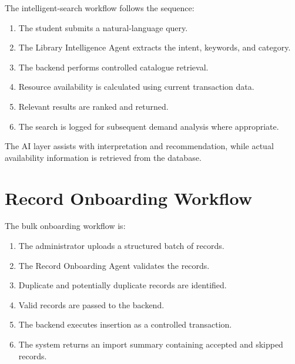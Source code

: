 \documentclass{tietreport}
\begin{document}
The intelligent-search workflow follows the sequence:

\begin{enumerate}

    \item The student submits a natural-language query.

    \item The Library Intelligence Agent extracts the intent, keywords,
    and category.

    \item The backend performs controlled catalogue retrieval.

    \item Resource availability is calculated using current transaction
    data.

    \item Relevant results are ranked and returned.

    \item The search is logged for subsequent demand analysis where
    appropriate.

\end{enumerate}

The AI layer assists with interpretation and recommendation, while actual
availability information is retrieved from the database.

\section{Record Onboarding Workflow}

The bulk onboarding workflow is:

\begin{enumerate}

    \item The administrator uploads a structured batch of records.

    \item The Record Onboarding Agent validates the records.

    \item Duplicate and potentially duplicate records are identified.

    \item Valid records are passed to the backend.

    \item The backend executes insertion as a controlled transaction.

    \item The system returns an import summary containing accepted and
    skipped records.

\end{enumerate}
\end{document}
